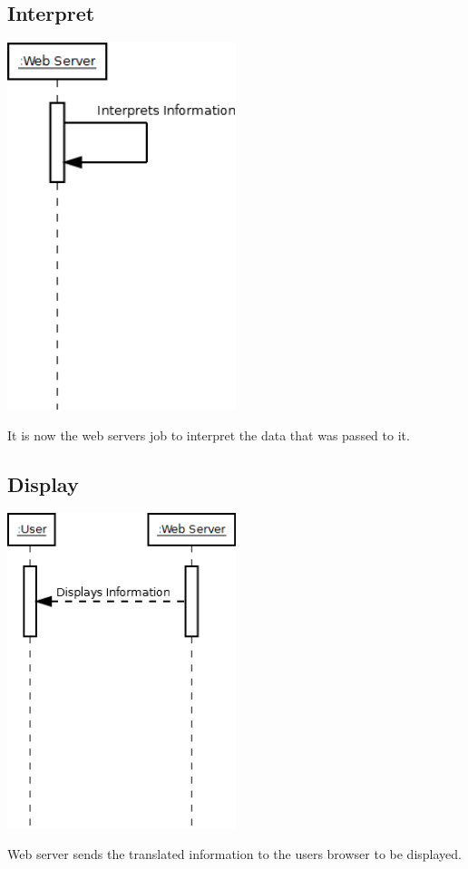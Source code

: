 	\subsection{Interpret}
	\includegraphics[width=0.50\textwidth]{./Interact6.png}
	
	It is now the web servers job to interpret the data that was passed to it.
	
	\subsection{Display}
	\includegraphics[width=0.50\textwidth]{./Interact7.png}
	
	Web server sends the translated information to the users browser to be displayed.
	

